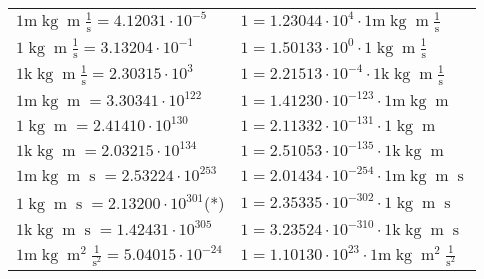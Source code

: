\begin{center}
\begin{longtable}{l l}
{\color{gray}$1 \bm{\mathrm{ m}}\operatorname{kg}{\operatorname{m}}\frac1{\operatorname{s}}{}{} = 4.12031\cdot10^{-5} $}   & {\color{gray}$ 1 = 1.23044\cdot10^{4} \cdot 1 \bm{\mathrm{ m}}\operatorname{kg}{\operatorname{m}}\frac1{\operatorname{s}}{}{}$}  \\
{\color{black}$1 \bm{\mathrm{ }}\operatorname{kg}{\operatorname{m}}\frac1{\operatorname{s}}{}{} = 3.13204\cdot10^{-1} $}   & {\color{black}$ 1 = 1.50133\cdot10^{0} \cdot 1 \bm{\mathrm{ }}\operatorname{kg}{\operatorname{m}}\frac1{\operatorname{s}}{}{}$}  \\
{\color{gray}$1 \bm{\mathrm{ k}}\operatorname{kg}{\operatorname{m}}\frac1{\operatorname{s}}{}{} = 2.30315\cdot10^{3} $}   & {\color{gray}$ 1 = 2.21513\cdot10^{-4} \cdot 1 \bm{\mathrm{ k}}\operatorname{kg}{\operatorname{m}}\frac1{\operatorname{s}}{}{}$}  \\
{\color{gray}$1 \bm{\mathrm{ m}}\operatorname{kg}{\operatorname{m}}{}{}{} = 3.30341\cdot10^{122} $}   & {\color{gray}$ 1 = 1.41230\cdot10^{-123} \cdot 1 \bm{\mathrm{ m}}\operatorname{kg}{\operatorname{m}}{}{}{}$}  \\
{\color{black}$1 \bm{\mathrm{ }}\operatorname{kg}{\operatorname{m}}{}{}{} = 2.41410\cdot10^{130} $}   & {\color{black}$ 1 = 2.11332\cdot10^{-131} \cdot 1 \bm{\mathrm{ }}\operatorname{kg}{\operatorname{m}}{}{}{}$}  \\
{\color{gray}$1 \bm{\mathrm{ k}}\operatorname{kg}{\operatorname{m}}{}{}{} = 2.03215\cdot10^{134} $}   & {\color{gray}$ 1 = 2.51053\cdot10^{-135} \cdot 1 \bm{\mathrm{ k}}\operatorname{kg}{\operatorname{m}}{}{}{}$}  \\
{\color{gray}$1 \bm{\mathrm{ m}}\operatorname{kg}{\operatorname{m}}{\operatorname{s}}{}{} = 2.53224\cdot10^{253} $}   & {\color{gray}$ 1 = 2.01434\cdot10^{-254} \cdot 1 \bm{\mathrm{ m}}\operatorname{kg}{\operatorname{m}}{\operatorname{s}}{}{}$}  \\
{\color{black}$1 \bm{\mathrm{ }}\operatorname{kg}{\operatorname{m}}{\operatorname{s}}{}{} = 2.13200\cdot10^{301} $}\quad(*) & {\color{black}$ 1 = 2.35335\cdot10^{-302} \cdot 1 \bm{\mathrm{ }}\operatorname{kg}{\operatorname{m}}{\operatorname{s}}{}{}$}  \\
{\color{gray}$1 \bm{\mathrm{ k}}\operatorname{kg}{\operatorname{m}}{\operatorname{s}}{}{} = 1.42431\cdot10^{305} $}   & {\color{gray}$ 1 = 3.23524\cdot10^{-310} \cdot 1 \bm{\mathrm{ k}}\operatorname{kg}{\operatorname{m}}{\operatorname{s}}{}{}$}  \\
{\color{gray}$1 \bm{\mathrm{ m}}\operatorname{kg}{\operatorname{m}^2}\frac1{\operatorname{s}^2}{}{} = 5.04015\cdot10^{-24} $}   & {\color{gray}$ 1 = 1.10130\cdot10^{23} \cdot 1 \bm{\mathrm{ m}}\operatorname{kg}{\operatorname{m}^2}\frac1{\operatorname{s}^2}{}{}$}  \\

\end{longtable}
\end{center}
